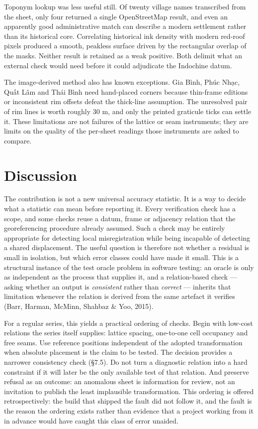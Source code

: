 \documentclass[11pt,a4paper]{article}
\begin{document}
Toponym lookup was less useful still. Of twenty village names transcribed from the sheet, only four returned a single OpenStreetMap result, and even an apparently good administrative match can describe a modern settlement rather than its historical core. Correlating historical ink density with modern red-roof pixels produced a smooth, peakless surface driven by the rectangular overlap of the masks. Neither result is retained as a weak positive. Both delimit what an external check would need before it could adjudicate the Indochine datum.

The image-derived method also has known exceptions. Gia Bình, Phúc Nhạc, Quất Lâm and Thái Bình need hand-placed corners because thin-frame editions or inconsistent rim offsets defeat the thick-line assumption. The unresolved pair of rim lines is worth roughly 30 m, and only the printed graticule ticks can settle it. These limitations are not failures of the lattice or seam instruments; they are limits on the quality of the per-sheet readings those instruments are asked to compare.

\section{Discussion}

The contribution is not a new universal accuracy statistic. It is a way to decide what a statistic can mean before reporting it. Every verification check has a scope, and some checks reuse a datum, frame or adjacency relation that the georeferencing procedure already assumed. Such a check may be entirely appropriate for detecting local misregistration while being incapable of detecting a shared displacement. The useful question is therefore not whether a residual is small in isolation, but which error classes could have made it small. This is a structural instance of the test oracle problem in software testing: an oracle is only as independent as the process that supplies it, and a relation-based check — asking whether an output is \emph{consistent} rather than \emph{correct} — inherits that limitation whenever the relation is derived from the same artefact it verifies (Barr, Harman, McMinn, Shahbaz \& Yoo, 2015).

For a regular series, this yields a practical ordering of checks. Begin with low-cost relations the series itself supplies: lattice spacing, one-to-one cell occupancy and free seams. Use reference positions independent of the adopted transformation when absolute placement is the claim to be tested. The \texttt{} decision provides a narrower consistency check (§7.5). Do not turn a diagnostic relation into a hard constraint if it will later be the only available test of that relation. And preserve refusal as an outcome: an anomalous sheet is information for review, not an invitation to publish the least implausible transformation. This ordering is offered retrospectively: the build that shipped the fault did not follow it, and the fault is the reason the ordering exists rather than evidence that a project working from it in advance would have caught this class of error unaided.
\end{document}
